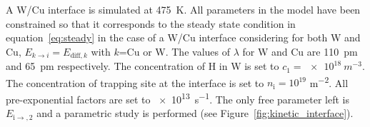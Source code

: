 

\indent A W/Cu interface is simulated at \SI{475}{K}.
All parameters in the model have been constrained so that it corresponds to the steady state condition in equation~\ref{eq:steady} in the case of a W/Cu interface considering for both W and Cu, $E_{k\rightarrow i}=E_{\mathrm{diff},k}$ with $k$=Cu or W.
The values of $\lambda$ for W and Cu are \SI{110}{pm} and \SI{65}{pm} respectively.
The concentration of H in W is set to $c_1=\SI{e18}{m^{-3}}$.
The concentration of trapping site at the interface is set to $n_\mathrm{i}=10^{19}$ \si{m^{-2}}.
All pre-exponential factors are set to \SI{e13}{s^{-1}}.
The only free parameter left is $E_{\mathrm{i\rightarrow},2}$ and a parametric study is performed (see Figure~\ref{fig:kinetic_interface}).

